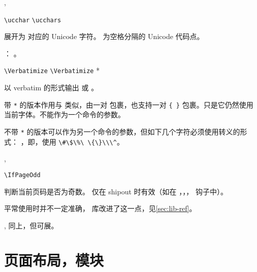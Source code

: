 \documentclass{cusdoc}
\begin{document}
\begin{function}[rEXP]{\ucchar,\ucchars}
  \begin{syntax}
    \verb|\ucchar|  
    \verb|\ucchars| 
  \end{syntax}
展开为  对应的 Unicode 字符。 为空格分隔的 
Unicode 代码点。
\end{function}

\begin{xample}
：%
。
\stopxamplecode 
\xampleprint
\end{xample}

\begin{function}{\Verbatimize}
  \begin{syntax}
    \verb|\Verbatimize|   
    \verb|\Verbatimize| *   
  \end{syntax}
以 verbatim 的形式输出  或 。

带 \verb|*| 的版本作用与  类似，由一对  包裹，也支持一对 \verb|{ }| 包裹。只是它仍然使用当前字体。不能作为一个命令的参数。

不带 \verb|*| 的版本可以作为另一个命令的参数，但如下几个字符必须使用转义的形式：
\texttt{\Verbatimize{\#\$\%\ \{\}\\\^}}，即，使用 \verb|\#\$\%\ \{\}\\\^|。
\end{function}

\begin{function}{\IfPageOdd,\IfAbsPageOdd}
  \begin{syntax}
    \verb|\IfPageOdd|  
  \end{syntax}
判断当前页码是否为奇数。 仅在 shipout 时有效（如在 ，，，
 钩子中）。

平常使用时并不一定准确， 库改进了这一点，见\cref{sec:lib-ref}。
\end{function}

\begin{function}[EXP]{\@ifpageodd,\@ifabspageodd}
同上，但可展。
\end{function}


\section[float-barrier=on]{页面布局，模块}
\end{document}
